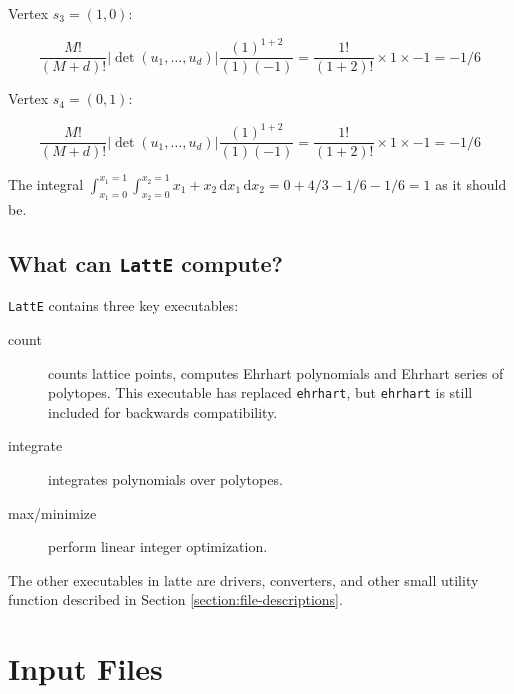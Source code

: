 \documentclass{article}
\newcommand{\latte}{{\tt LattE}\xspace}
\renewcommand\d{\,\mathrm{d}}
\begin{document}
Vertex $s_3 = (1,0)$: 
	
\begin{displaymath}
 \frac{M!}{(M+d)!} |\det(u_1, \dots, u_d)| \frac{(1)^{1+2}}{(1)(-1)} = \frac{1!}{(1+2)!} \times 1 \times -1 = -1/6
\end{displaymath}


Vertex $s_4 = (0,1):$ 


\begin{displaymath}
 \frac{M!}{(M+d)!} |\det(u_1, \dots, u_d)| \frac{(1)^{1+2}}{(1)(-1)} = \frac{1!}{(1+2)!} \times 1 \times -1 = -1/6
\end{displaymath}

The integral $\int_{x_1 = 0}^{x_1 = 1}\int_{x_2 = 0}^{x_2 = 1} x_1 +x_2  \d{x_1}\d{x_2} = 0 + 4/3 -1/6 - 1/6 = 1$ as it should be.




\subsection{What can {\tt LattE} compute?}

\latte contains three key executables:
\begin{description}
	\item[count] counts lattice points, computes Ehrhart polynomials and Ehrhart series of polytopes. This executable has replaced {\tt ehrhart}, but {\tt ehrhart} is still included for backwards compatibility.
	\item[integrate] integrates polynomials over polytopes.
	\item[max/minimize] perform linear integer optimization.
\end{description}

The other executables in latte are drivers, converters, and other small utility function described in Section \ref{section:file-descriptions}.


\section{Input Files}\label{Input Files}
\end{document}
